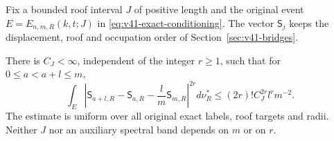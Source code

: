 Fix a bounded roof interval $J$ of positive length and the original
event $E=E_{n,m,R}(k,t;J)$ in \eqref{eq:v41-exact-conditioning}.
The vector $\mathsf S_j$ keeps the displacement, roof and occupation
order of Section~\ref{sec:v41-bridges}.

\begin{proposition}
\label{prop:v53-all-increment-moments}
There is $C_J<\infty$, independent of the integer $r\ge1$, such that
for $0\le a<a+l\le m$,
\begin{equation}\label{eq:v53-all-increment-moments}
 \int_E\left|\mathsf S_{a+l,R}-\mathsf S_{a,R}
                         -\frac lm\mathsf S_{m,R}\right|^{2r}d\nu_R^*
            \le (2r)!C_J^{2r}l^r m^{-2}.
\end{equation}
The estimate is uniform over all original exact labels, roof targets
and radii. Neither $J$ nor an auxiliary spectral band depends on $m$
or on $r$.
\end{proposition}
